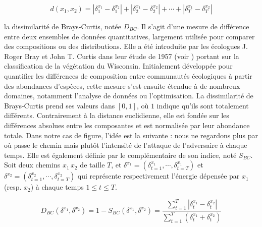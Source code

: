 \documentclass[12pt, a4paper, twoside]{report}
\numberwithin{equation}{section}
\begin{document}
\begin{Figure}[H]
    \begin{equation}
        d(x_1, x_2)=|\delta_1^{x_1} - \delta_1^{x_2}|+|\delta_2^{x_1} - \delta_2^{x_2}|+\cdots+|\delta_T^{x_1} - \delta_T^{x_2}|
    \end{equation}


    
    
    
    
    
    
    
    
    
    
    
    
    la dissimilarité de Brays-Curtis, notée $D_{BC}$. Il s'agit d'une mesure de différence entre deux ensembles de données quantitatives, largement utilisée pour comparer des compositions ou des distributions. Elle a été introduite par les écologues J. Roger Bray et John T. Curtis dans leur étude de 1957 (voir \cite{brays_curtis_fondement}) portant sur la classification de la végétation du Wisconsin. Initialement développée pour quantifier les différences de composition entre communautés écologiques à partir des abondances d'espèces, cette mesure s'est ensuite étendue à de nombreux domaines, notamment l'analyse de données ou l'optimisation. La dissimilarité de Brays-Curtis prend ses valeurs dans $[0, 1]$, où $1$ indique qu'ils sont totalement différents. Contrairement à la distance euclidienne, elle est fondée sur les différences absolues entre les composantes et est normalisée par leur abondance totale. Dans notre cas de figure, l'idée est la suivante : nous ne regardons plus par où passe le chemin mais plutôt l'intensité de l'attaque de l'adversaire à chaque temps. Elle est également définie par le complémentaire de son indice, noté $S_{BC}$. Soit deux chemins $x_1\, x_2$ de taille $T$, et $\delta^{x_1}=(\delta_{t=1}^{x_1}, \cdots, \delta_{t=T}^{x_1})$ et $\delta^{x_2}=(\delta_{t=1}^{x_2}, \cdots, \delta_{t=T}^{x_2})$ qui représente respectivement l'énergie dépensée par $x_1$ (resp. $x_2$) à chaque temps $1\leq t\leq T$. 
	
	\begin{equation}
		D_{BC}(\delta^{x_1}, \delta^{x_2})=1-S_{BC}(\delta^{x_1}, \delta^{x_2})=\frac{\sum_{t=1}^T|\delta^{x_1}_t-\delta^{x_2}_t|}{\sum_{t=1}^T(\delta^{x_1}_t+\delta^{x_2}_t)}
	\end{equation}
	

\end{Figure}
\end{document}
